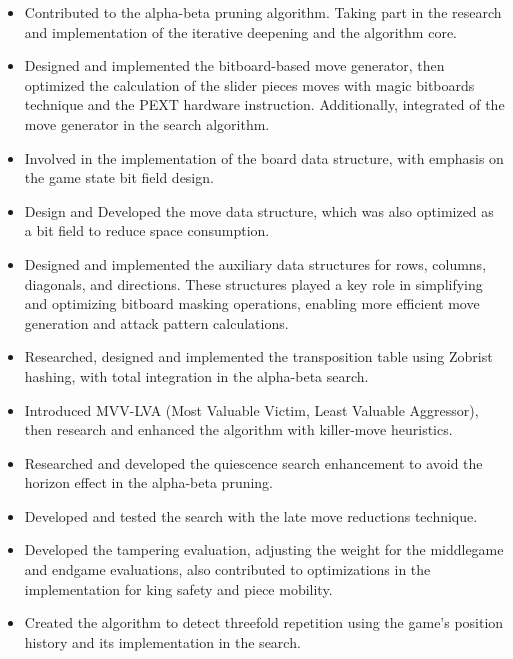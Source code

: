 \begin{itemize}

    \item Contributed to the alpha-beta pruning algorithm. Taking part in the research and implementation of the iterative deepening and the algorithm core.

    \item Designed and implemented the bitboard-based move generator, then optimized the calculation of the slider pieces moves with magic bitboards technique and the PEXT hardware instruction. Additionally, integrated of the move generator in the search algorithm.

    \item Involved in the implementation of the board data structure, with emphasis on the game state bit field design.

    \item Design and Developed the move data structure, which was also optimized as a bit field to reduce space consumption.    

    \item Designed and implemented the auxiliary data structures for rows, columns, diagonals, and directions. These structures played a key role in simplifying and optimizing bitboard masking operations, enabling more efficient move generation and attack pattern calculations.
    
    \item Researched, designed and implemented the transposition table using Zobrist hashing, with total integration in the alpha-beta search.

    \item Introduced MVV-LVA (Most Valuable Victim, Least Valuable Aggressor), then research and enhanced the algorithm with killer-move heuristics.

    \item Researched and developed the quiescence search enhancement to avoid the horizon effect in the alpha-beta pruning.

    \item Developed and tested the search with the late move reductions technique.

    \item Developed the tampering evaluation, adjusting the weight for the middlegame and endgame evaluations, also contributed to optimizations in the implementation for king safety and piece mobility.

    \item Created the algorithm to detect threefold repetition using the game's position history and its implementation in the search.


\end{itemize}
